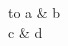 \documentclass{article}\usepackage{tabu}
\begin{document}
\begin{tabu} to \linewidth {X[l]X[r]}
a & b \\
c & d \\
\end{tabu}
\end{document}
